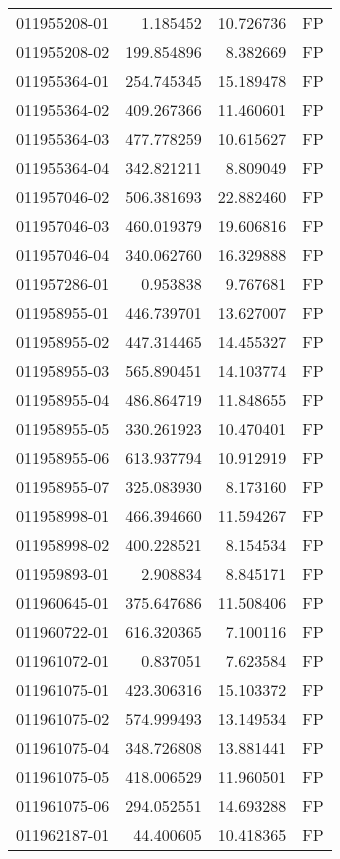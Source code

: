 \begin{tabular}{lrrl}
011955208-01 &    1.185452 &    10.726736 &   FP \\
011955208-02 &  199.854896 &     8.382669 &   FP \\
011955364-01 &  254.745345 &    15.189478 &   FP \\
011955364-02 &  409.267366 &    11.460601 &   FP \\
011955364-03 &  477.778259 &    10.615627 &   FP \\
011955364-04 &  342.821211 &     8.809049 &   FP \\
011957046-02 &  506.381693 &    22.882460 &   FP \\
011957046-03 &  460.019379 &    19.606816 &   FP \\
011957046-04 &  340.062760 &    16.329888 &   FP \\
011957286-01 &    0.953838 &     9.767681 &   FP \\
011958955-01 &  446.739701 &    13.627007 &   FP \\
011958955-02 &  447.314465 &    14.455327 &   FP \\
011958955-03 &  565.890451 &    14.103774 &   FP \\
011958955-04 &  486.864719 &    11.848655 &   FP \\
011958955-05 &  330.261923 &    10.470401 &   FP \\
011958955-06 &  613.937794 &    10.912919 &   FP \\
011958955-07 &  325.083930 &     8.173160 &   FP \\
011958998-01 &  466.394660 &    11.594267 &   FP \\
011958998-02 &  400.228521 &     8.154534 &   FP \\
011959893-01 &    2.908834 &     8.845171 &   FP \\
011960645-01 &  375.647686 &    11.508406 &   FP \\
011960722-01 &  616.320365 &     7.100116 &   FP \\
011961072-01 &    0.837051 &     7.623584 &   FP \\
011961075-01 &  423.306316 &    15.103372 &   FP \\
011961075-02 &  574.999493 &    13.149534 &   FP \\
011961075-04 &  348.726808 &    13.881441 &   FP \\
011961075-05 &  418.006529 &    11.960501 &   FP \\
011961075-06 &  294.052551 &    14.693288 &   FP \\
011962187-01 &   44.400605 &    10.418365 &   FP \\

\end{tabular}
